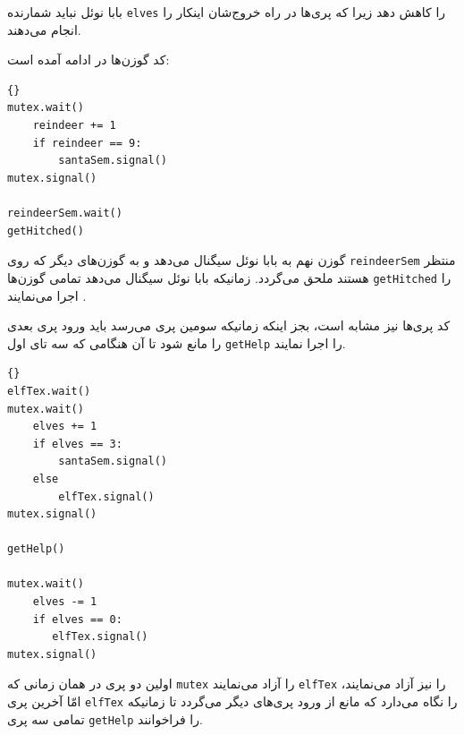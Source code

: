 \documentclass{book}
\begin{document}
    بابا نوئل نباید شمارنده {\tt elves} را کاهش دهد زیرا که پری‌ها در راه خروج‌شان اینکار را انجام می‌دهند. 

    کد گوزن‌ها در ادامه آمده است: 

\begin{latin}
\begin{lstlisting}[title=\rl{راه حل مسأله بابا نوئل (گوزن‌ها)}]{}
mutex.wait()
    reindeer += 1
    if reindeer == 9:
        santaSem.signal()
mutex.signal()

reindeerSem.wait()
getHitched()
\end{lstlisting}
\end{latin}

     گوزن نهم به بابا نوئل سیگنال می‌دهد و به گوزن‌های دیگر که روی  {\tt reindeerSem} منتظر هستند ملحق می‌گردد. 
     زمانیکه بابا نوئل سیگنال می‌دهد تمامی گوزن‌ها {\tt getHitched} را اجرا می‌نمایند .
    

    کد پری‌‌ها نیز مشابه است، بجز اینکه زمانیکه سومین پری می‌رسد باید ورود پری بعدی را مانع شود تا آن هنگامی که سه تای اول {\tt getHelp} را اجرا نمایند. 

\newpage
\begin{latin}
\begin{lstlisting}[title=\rl{راه حل مسأله بابا نوئل (پری‌ها)}]{}
elfTex.wait()
mutex.wait()
    elves += 1
    if elves == 3:
        santaSem.signal()
    else
        elfTex.signal()
mutex.signal()

getHelp()

mutex.wait()
    elves -= 1
    if elves == 0:
       elfTex.signal()
mutex.signal()
\end{lstlisting}
\end{latin}

    اولین دو پری  در همان زمانی که {\tt mutex} را  آزاد می‌نمایند {\tt elfTex} را نیز آزاد می‌نمایند،‌ امّا آخرین پری  {\tt elfTex} را نگاه می‌دارد که 
    مانع از ورود پری‌های دیگر می‌گردد تا زمانیکه تمامی سه پری {\tt getHelp} را فراخوانند. 
\end{document}

